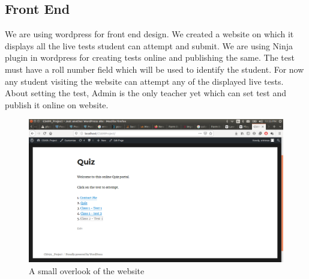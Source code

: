\subsection{Front End}
We are using wordpress \cite{word} for front end design. We created a website on which it displays all the live tests student can attempt and submit. We are using Ninja plugin in wordpress for creating tests online and publishing the same. The test must have a roll number field which will be used to identify the student. For now any student visiting the website can attempt any of the displayed live tests. About setting the test, Admin is the only teacher yet which can set test and publish it online on website. \\
\begin{figure}[H]
    \centering
    \includegraphics[width=0.5\paperwidth]{images/Website.png}
    \caption{A small overlook of the website}
    \label{fig:galaxy}
\end{figure}

